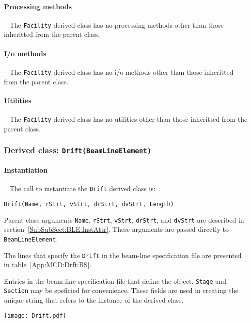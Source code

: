 \paragraph{Processing methods} ~\newline
\noindent
The \texttt{Facility} derived class has no processing methods other
than those inheritted from the parent class.

\paragraph{I/o methods} ~\newline
\noindent
The \texttt{Facility} derived class has no i/o methods other than
those inheritted from the parent class.

\paragraph{Utilities} ~\newline
\noindent
The \texttt{Facility} derived class has no utilities other than those
inheritted from the parent class. 

\FloatBarrier

\subsubsection{Derived class: \texttt{Drift(BeamLineElement)}}

\paragraph{Instantiation} ~\newline
\noindent
The call to instantiate the \texttt{Drift} derived class is:
\begin{center}
  \texttt{Drift(Name, rStrt, vStrt, drStrt, dvStrt, Length)}
\end{center}
Parent class arguments \texttt{Name}, \texttt{rStrt}, \texttt{vStrt},
\texttt{drStrt}, and \texttt{dvStrt} are described in
section~\ref{SubSubSect:BLE:InstAttr}.
These arguments are passed directly to \texttt{BeamLineElement}.

The lines that specify the \texttt{Drift} in the beam-line
specification file are presented in table~\ref{App:MCD:Drft:BS}.
\begin{table}[h]
  \caption{
    Entries in the beam-line specification file that define the
    object.
    \texttt{Stage} and \texttt{Section} may be speficied for
    convenience.
    These fields are used in creating the unique string that refers
    to the instance of the derived class.
  }
  \label{App:MCD:Drft:BS}
  \begin{center}
    \texttt{[image: Drift.pdf]}
  \end{center}
\end{table}

